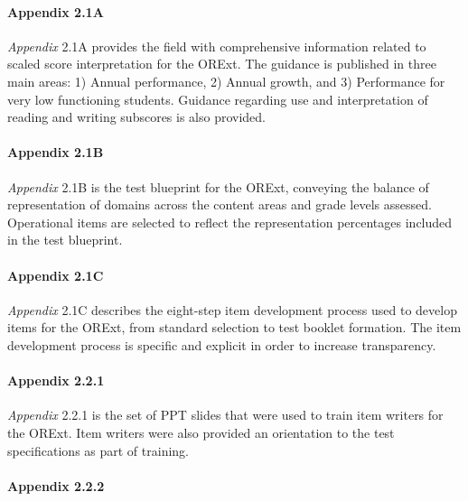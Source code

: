 \documentclass[]{article}
\let\oldparagraph\paragraph
\renewcommand{\paragraph}[1]{\oldparagraph{#1}\mbox{}}
\begin{document}
\hypertarget{appendix-2.1a}{%
\paragraph{Appendix 2.1A}\label{appendix-2.1a}}

\emph{Appendix} 2.1A provides the field with comprehensive information
related to scaled score interpretation for the ORExt. The guidance is
published in three main areas: 1) Annual performance, 2) Annual growth,
and 3) Performance for very low functioning students. Guidance regarding
use and interpretation of reading and writing subscores is also
provided.

\hypertarget{appendix-2.1b}{%
\paragraph{Appendix 2.1B}\label{appendix-2.1b}}

\emph{Appendix} 2.1B is the test blueprint for the ORExt, conveying the
balance of representation of domains across the content areas and grade
levels assessed. Operational items are selected to reflect the
representation percentages included in the test blueprint.

\hypertarget{appendix-2.1c}{%
\paragraph{Appendix 2.1C}\label{appendix-2.1c}}

\emph{Appendix} 2.1C describes the eight-step item development process
used to develop items for the ORExt, from standard selection to test
booklet formation. The item development process is specific and explicit
in order to increase transparency.

\hypertarget{appendix-2.2.1}{%
\paragraph{Appendix 2.2.1}\label{appendix-2.2.1}}

\emph{Appendix} 2.2.1 is the set of PPT slides that were used to train
item writers for the ORExt. Item writers were also provided an
orientation to the test specifications as part of training.

\hypertarget{appendix-2.2.2}{%
\paragraph{Appendix 2.2.2}\label{appendix-2.2.2}}
\end{document}
